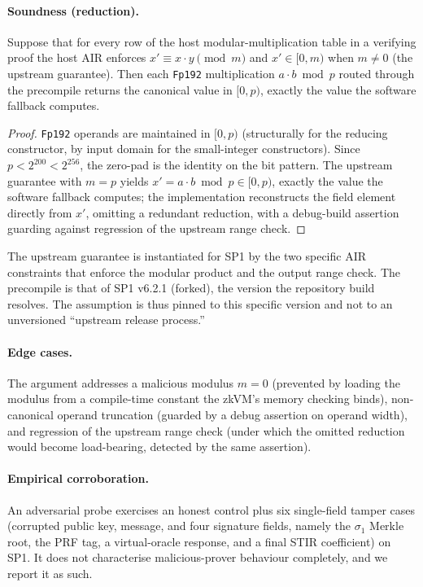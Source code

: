 \paragraph{Soundness (reduction).}
\begin{lemma}\label{lem:fp192-mul}
    Suppose that for every row of the host modular-multiplication table in a verifying proof the host AIR enforces $x' \equiv x\cdot y \pmod{m}$ and $x' \in [0,m)$ when $m\neq 0$ (the upstream guarantee). Then each \texttt{Fp192} multiplication $a\cdot b \bmod p$ routed through the precompile returns the canonical value in $[0,p)$, exactly the value the software fallback computes.
\end{lemma}
\begin{proof}
    \texttt{Fp192} operands are maintained in $[0,p)$ (structurally for the reducing constructor, by input domain for the small-integer constructors). Since $p < 2^{200} < 2^{256}$, the zero-pad is the identity on the bit pattern. The upstream guarantee with $m=p$ yields $x' = a\cdot b \bmod p \in [0,p)$, exactly the value the software fallback computes; the implementation reconstructs the field element directly from $x'$, omitting a redundant reduction, with a debug-build assertion guarding against regression of the upstream range check.
\end{proof}
The upstream guarantee is instantiated for SP1 by the two specific AIR constraints that enforce the modular product and the output range check. The precompile is that of SP1 v6.2.1 (forked), the version the repository build resolves. The assumption is thus pinned to this specific version and not to an unversioned ``upstream release process.''

\paragraph{Edge cases.}
The argument addresses a malicious modulus $m=0$ (prevented by loading the modulus from a compile-time constant the zkVM's memory checking binds), non-canonical operand truncation (guarded by a debug assertion on operand width), and regression of the upstream range check (under which the omitted reduction would become load-bearing, detected by the same assertion).

\paragraph{Empirical corroboration.}
An adversarial probe exercises an honest control plus six single-field tamper cases (corrupted public key, message, and four signature fields, namely the $\sigma_1$ Merkle root, the PRF tag, a virtual-oracle response, and a final STIR coefficient) on SP1. It does not characterise malicious-prover behaviour completely, and we report it as such.

